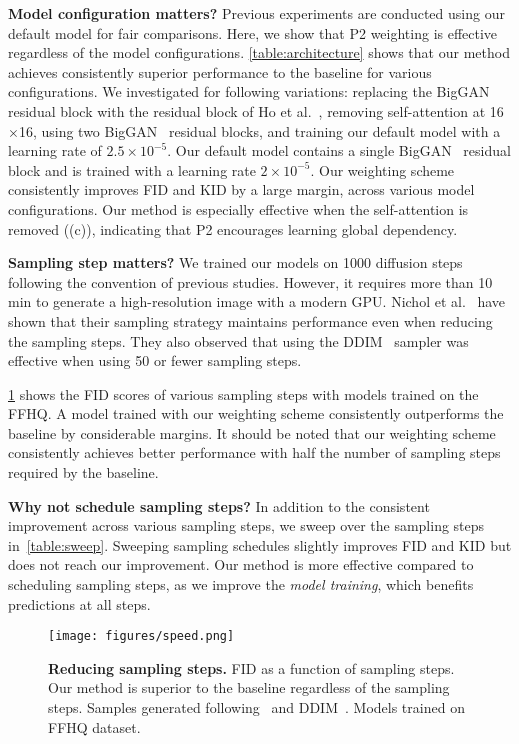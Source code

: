 \textbf{Model configuration matters?  }
Previous experiments are conducted using our default model for fair comparisons. Here, we show that P2 weighting is effective regardless of the model configurations. \cref{table:architecture} shows that our method achieves consistently superior performance to the baseline for various configurations. We investigated for following variations: replacing the BigGAN~\cite{brock2018large} residual block with the residual block of Ho et al.~\cite{ho2020denoising}, removing self-attention at 16$\times$16, using two BigGAN~\cite{brock2018large} residual blocks, and training our default model with a learning rate of $2.5\times10^{-5}$. Our default model contains a single BigGAN~\cite{brock2018large} residual block and is trained with a learning rate $2\times10^{-5}$. Our weighting scheme consistently improves FID and KID by a large margin, across various model configurations. Our method is especially effective when the self-attention is removed ((c)), indicating that P2 encourages learning global dependency.
\vspace{0.5em}

\textbf{Sampling step matters?  }
We trained our models on 1000 diffusion steps following the convention of previous studies. However, it requires more than 10 min to generate a high-resolution image with a modern GPU. Nichol et al.~\cite{nichol2021improved} have shown that their sampling strategy maintains performance even when reducing the sampling steps. They also observed that using the DDIM~\cite{song2020denoising} sampler was effective when using 50 or fewer sampling steps.

\cref{fig:speed} shows the FID scores of various sampling steps with models trained on the FFHQ. A model trained with our weighting scheme consistently outperforms the baseline by considerable margins. It should be noted that our weighting scheme consistently achieves better performance with half the number of sampling steps required by the baseline.

\textbf{Why not schedule sampling steps?  } 
In addition to the consistent improvement across various sampling steps, we sweep over the sampling steps in~\cref{table:sweep}. Sweeping sampling schedules slightly improves FID and KID but does not reach our improvement. Our method is more effective compared to scheduling sampling steps, as we improve the \textit{model training}, which benefits predictions at all steps.





\begin{figure}[t!]
  \centering
  \texttt{[image: figures/speed.png]}
  \caption{\textbf{Reducing sampling steps.} FID as a function of sampling steps. Our method is superior to the baseline regardless of the sampling steps. Samples generated following~\cite{nichol2021improved} and DDIM~\cite{song2020denoising}. Models trained on FFHQ dataset.}
  \label{fig:speed}
\end{figure}




